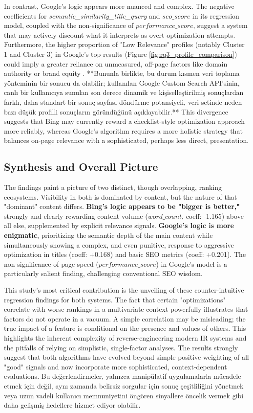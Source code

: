 \documentclass[a4paper,fleqn]{cas-sc}
\newcommand{\longvar}[1]{\textit{#1}}
\begin{document}
In contrast, Google's logic appears more nuanced and complex. The negative coefficients for \longvar{semantic_similarity_title_query} and $seo\_score$ in its regression model, coupled with the non-significance of $performance\_score$, suggest a system that may actively discount what it interprets as overt optimization attempts. Furthermore, the higher proportion of "Low Relevance" profiles (notably Cluster 1 and Cluster 3) in Google's top results (Figure \ref{fig:rq3_profile_comparison}) could imply a greater reliance on unmeasured, off-page factors like domain authority or brand equity \citep{Toms2004}. **Bununla birlikte, bu durum kısmen veri toplama yönteminin bir sonucu da olabilir; kullanılan Google Custom Search API'sinin, canlı bir kullanıcıya sunulan son derece dinamik ve kişiselleştirilmiş sonuçlardan farklı, daha standart bir sonuç sayfası döndürme potansiyeli, veri setinde neden bazı düşük profilli sonuçların göründüğünü açıklayabilir.** This divergence suggests that Bing may currently reward a checklist-style optimization approach more reliably, whereas Google's algorithm requires a more holistic strategy that balances on-page relevance with a sophisticated, perhaps less direct, presentation.

\subsection{Synthesis and Overall Picture}
\label{subsec:discussion_synthesis}
The findings paint a picture of two distinct, though overlapping, ranking ecosystems. Visibility in both is dominated by content, but the nature of that "dominant" content differs. \textbf{Bing's logic appears to be "bigger is better,"} strongly and clearly rewarding content volume ($word\_count$, coeff: -1.165) above all else, supplemented by explicit relevance signals. \textbf{Google's logic is more enigmatic}, prioritizing the semantic depth of the main content while simultaneously showing a complex, and even punitive, response to aggressive optimization in titles (coeff: +0.168) and basic SEO metrics (coeff: +0.201). The non-significance of page speed ($performance\_score$) in Google's model is a particularly salient finding, challenging conventional SEO wisdom.

This study's most critical contribution is the unveiling of these counter-intuitive regression findings for both systems. The fact that certain "optimizations" correlate with worse rankings in a multivariate context powerfully illustrates that factors do not operate in a vacuum. A simple correlation may be misleading; the true impact of a feature is conditional on the presence and values of others. This highlights the inherent complexity of reverse-engineering modern IR systems and the pitfalls of relying on simplistic, single-factor analyses. The results strongly suggest that both algorithms have evolved beyond simple positive weighting of all "good" signals and now incorporate more sophisticated, context-dependent evaluations. Bu değerlendirmeler, yalnızca manipülatif uygulamalarla mücadele etmek için değil, aynı zamanda belirsiz sorgular için sonuç çeşitliliğini yönetmek veya uzun vadeli kullanıcı memnuniyetini öngören sinyallere öncelik vermek gibi daha gelişmiş hedeflere hizmet ediyor olabilir.
\end{document}
